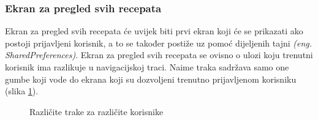 \documentclass[times, utf8, zavrsni]{fer}
\begin{document}
\subsubsection{Ekran za pregled svih recepata}
Ekran za pregled svih recepata će uvijek biti prvi ekran koji će se prikazati ako postoji
prijavljeni korisnik, a to se također postiže uz pomoć dijeljenih tajni \textit{(eng. SharedPreferences)}.
Ekran za pregled svih recepata se ovisno o ulozi koju trenutni korisnik ima razlikuje
u navigacijskoj traci. Naime traka sadržava samo one gumbe koji vode do ekrana koji su dozvoljeni
trenutno prijavljenom korisniku (slika \ref{fig:tracks}).
\begin{figure}[h]
      \centering
      \caption{Različite trake za različite korisnike}
      \label{fig:tracks}
\end{figure}
\end{document}
